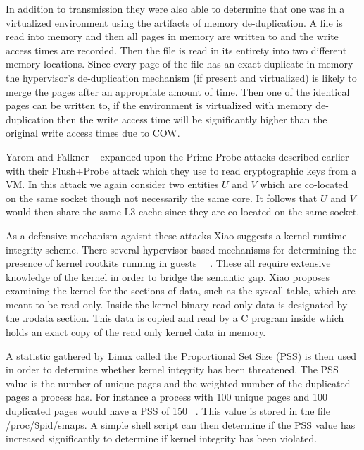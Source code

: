 In addition to transmission they were also able to determine that one was in a virtualized environment using the artifacts of memory de-duplication. A file is read into memory and then all pages in memory are written to and the write access times are recorded. Then the file is read in its entirety into two different memory locations. Since every page of the file has an exact duplicate in memory the hypervisor’s de-duplication mechanism (if present and virtualized) is likely to merge the pages after an appropriate amount of time. Then one of the identical pages can be written to, if the environment is virtualized with memory de-duplication then the write access time will be significantly higher than the original write access times due to COW. 


Yarom and Falkner ~\cite{yarom2013flush+} expanded upon the Prime-Probe attacks described earlier with their Flush+Probe attack which they use to read cryptographic keys from a VM. In this attack we again consider two entities $U$ and $V$ which are co-located on the same socket though not necessarily the same core. It follows that $U$ and $V$ would then share the same L3 cache since they are co-located on the same socket. 





As a defensive mechanism agaisnt these attacks Xiao suggests a kernel runtime integrity scheme.  There several hypervisor based mechanisms for determining the presence of kernel rootkits running in guests ~\cite{butler_windows_2005}~\cite{hoglund_*real*_1999}. These all require extensive knowledge of the kernel in order to bridge the semantic gap. Xiao proposes examining the kernel for the sections of data, such as the syscall table, which are meant to be read-only. Inside the kernel binary read only data is designated by the .rodata section. This data is copied and read by a C program inside which holds an exact copy of the read only kernel data in memory. 

A statistic gathered by Linux called the Proportional Set Size (PSS) is then used in order to determine whether kernel integrity has been threatened. The PSS value is the number of unique pages and the weighted number of the duplicated pages a process has. For instance a process with 100 unique pages and 100 duplicated pages would have a PSS of 150 ~\cite{xiao_security_2013}. This value is stored in the file /proc/\$pid/smaps. A simple shell script can then determine if the PSS value has increased significantly to determine if kernel integrity has been violated. 

